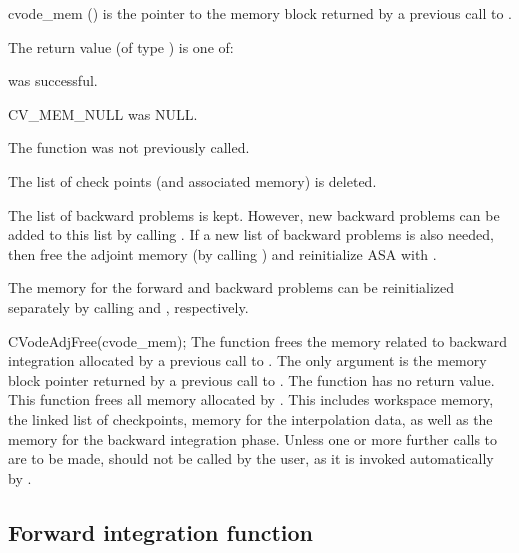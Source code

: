 {
  \begin{args}
  \item[cvode\_mem] ()
    is the pointer to the {\cvodes} memory block returned by a previous call to
    .
  \end{args}
}
{
   The return value  (of type ) is one of:
   \begin{args}
   \item[\Id{CV\_SUCCESS}]
      was successful.
   \item[CV\_MEM\_NULL]
      was NULL.
   \item[\Id{CV\_NO\_ADJ}]
     The function  was not previously called.
   \end{args}
}
{
  The list of check points (and associated memory) is deleted.

  The list of backward problems is kept. However, new backward problems can
  be added to this list by calling . If a new list of backward
  problems is also needed, then free the adjoint memory (by calling
  ) and reinitialize ASA with .

  The {\cvodes} memory for the forward and backward problems can be reinitialized
  separately by calling  and , respectively.
}
{
  CVodeAdjFree(cvode\_mem);
}
{
  The function  frees the memory related to backward integration
  allocated by a previous call to .
}
{
  The only argument is the {\cvodes} memory block pointer returned by a previous call
  to .
}
{
  The function  has no return value.
}
{
  This function frees all memory allocated by . This
  includes workspace memory, the linked list of checkpoints, memory
  for the interpolation data, as well as the {\cvodes} memory for the
  backward integration phase.  Unless one or more further calls to 
  are to be made,  should not be called by the user, as it is
  invoked automatically by .
}

\subsection{Forward integration function}
\label{sss:cvsolvef}

